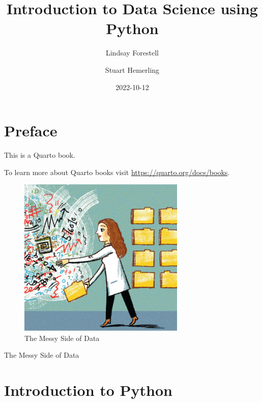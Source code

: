 \documentclass[
  letterpaper,
  DIV=11,
  numbers=noendperiod]{scrreprt}
\title{Introduction to Data Science using Python}
\author{Lindsay Forestell \and Stuart Hemerling}
\date{2022-10-12}
\renewcommand*\contentsname{Table of contents}
\newcommand\contentsname{Table of contents}
\begin{document}
\maketitle
\ifdefined\Shaded\renewenvironment{Shaded}{\begin{tcolorbox}[breakable, borderline west={3pt}{0pt}{shadecolor}, sharp corners, interior hidden, frame hidden, boxrule=0pt, enhanced]}{\end{tcolorbox}}\fi

\renewcommand*\contentsname{Table of contents}
{
\hypersetup{linkcolor=}
\setcounter{tocdepth}{3}
\tableofcontents
}

\hypertarget{preface}{%
\chapter*{Preface}\label{preface}}

This is a Quarto book.

To learn more about Quarto books visit
\url{https://quarto.org/docs/books}.

\begin{figure}

{\centering \includegraphics[width=3.125in,height=\textheight]{./images/introduction-to-python/reproducible.jpeg}

}

\caption{The Messy Side of Data}

\end{figure}

The Messy Side of Data


\hypertarget{introduction-to-python}{%
\chapter{Introduction to Python}\label{introduction-to-python}}
\end{document}
